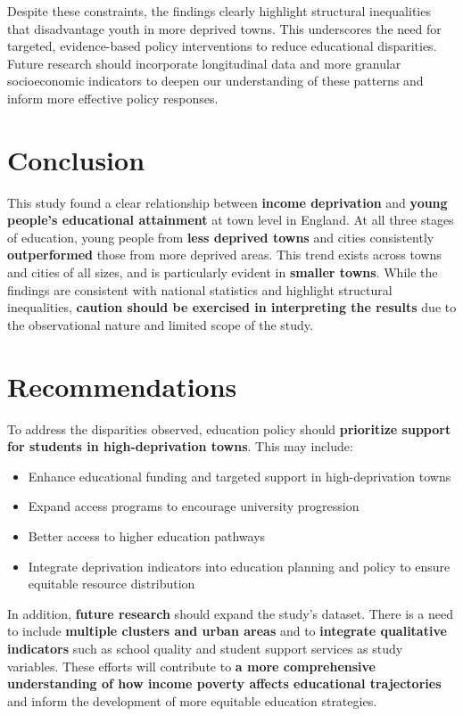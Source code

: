 \documentclass[11pt,en]{../resources/elegantpaper}
\begin{document}
Despite these constraints, the findings clearly highlight structural
inequalities that disadvantage youth in more deprived towns. This
underscores the need for targeted, evidence-based policy interventions
to reduce educational disparities. Future research should incorporate
longitudinal data and more granular socioeconomic indicators to deepen
our understanding of these patterns and inform more effective policy
responses.

\section{Conclusion}\label{conclusion}

This study found a clear relationship between \textbf{income
deprivation} and \textbf{young people's educational attainment} at town
level in England. At all three stages of education, young people from
\textbf{less deprived towns} and cities consistently
\textbf{outperformed} those from more deprived areas. This trend exists
across towns and cities of all sizes, and is particularly evident in
\textbf{smaller towns}. While the findings are consistent with national
statistics and highlight structural inequalities, \textbf{caution should
be exercised in interpreting the results} due to the observational
nature and limited scope of the study.

\section{Recommendations}\label{recommendations}

To address the disparities observed, education policy should
\textbf{prioritize support for students in high-deprivation towns}. This
may include:

\begin{itemize}
\item
  Enhance educational funding and targeted support in high-deprivation
  towns
\item
  Expand access programs to encourage university progression
\item
  Better access to higher education pathways
\item
  Integrate deprivation indicators into education planning and policy to
  ensure equitable resource distribution
\end{itemize}

In addition, \textbf{future research} should expand the study's dataset.
There is a need to include \textbf{multiple clusters and urban areas}
and to \textbf{integrate qualitative indicators} such as school quality
and student support services as study variables. These efforts will
contribute to \textbf{a more comprehensive understanding of how income
poverty affects educational trajectories} and inform the development of
more equitable education strategies.
\end{document}
